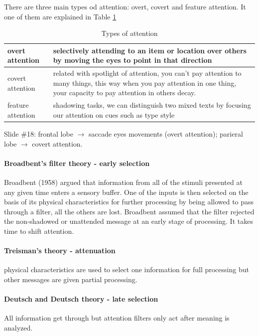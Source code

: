 \documentclass[12pt,article,oneside,a4paper]{memoir}
\begin{document}
There are three main types od attention: overt, covert and feature attention. It one of them are explained in Table \ref{table:types-attention}

\begin{table}
  \begin{tabular}{ p{5cm} |  p{10cm} }
    \hline
    overt attention & selectively attending to an item or location over others by moving the eyes to point in that direction \\ \hline
    covert attention & related with spotlight of attention, you can't pay attention to many things, this way when you pay attention in one thing, your capacity to pay attention in others decay. \\ \hline
    feature attention & shadowing tasks, we can distinguish two mixed texts by focusing our attention on cues such as type style \\ 
    \hline
  \end{tabular}
  \caption{Types of attention}
  \label{table:types-attention}
\end{table}

Slide \#18: frontal lobe $\rightarrow$ saccade eyes movements (overt attention); parieral lobe $\rightarrow$ covert attention.

\paragraph{Broadbent's filter theory - early selection} Broadbent (1958) argued that information from all of the stimuli presented at any given time enters a sensory buffer.  One of the inputs is then selected on the basis of its physical characteristics for further processing by being allowed to pass through a filter, all the others are lost.  Broadbent assumed that the filter rejected the non-shadowed or unattended message at an early stage of processing. It takes time to shift attention.

\paragraph{Treisman's theory - attenuation} physical characteristics are used to select one information for full processing but other messages are given partial processing. 

\paragraph{Deutsch and Deutsch theory - late selection} All information get through but attention filters only act after meaning is analyzed. 
\end{document}
